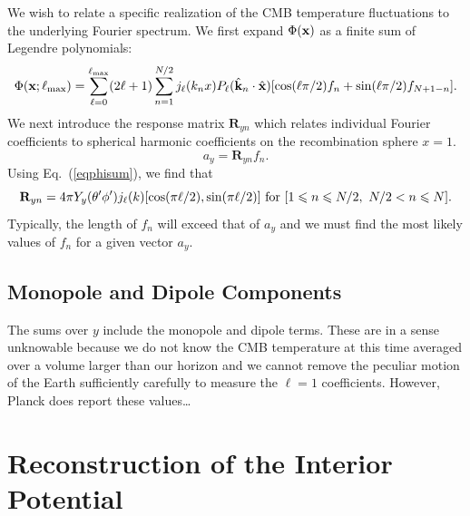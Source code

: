 \documentclass[useAMS,usenatbib,a4paper]{mn2e}
\begin{document}
We wish to relate a specific realization of the CMB temperature fluctuations to the underlying Fourier  spectrum. We first expand $\Phi({\bf x})$ as a finite sum of Legendre polynomials:
\begin{equation}
\Phi({\bf x;\ell_{\rm max}})=\sum_{\ell=0} ^{\ell_{\rm max}}(2\ell+1)\sum_{n=1}^{N/2}j_{\ell}(k_nx)P_{\ell}({\hat{\bf k}}_n\cdot{\hat{\bf x}})[\cos(\ell\pi/2)f_n+\sin(\ell\pi/2)f_{N+1-n}].
\label{eqphisum}
\end{equation}
We next introduce the response matrix ${\mathbf R}_{yn}$ which relates individual Fourier coefficients to spherical harmonic coefficients on the recombination sphere $x=1$.
\begin{equation}
a_y={\mathbf R}_{yn}f_n.
\end{equation}
Using Eq.~(\ref{eqphisum}), we find that 
\begin{equation}
\mathbf{R}_{yn}=4\pi Y_y(\theta'\phi')j_\ell(k)[\cos(\pi\ell/2),\sin(\pi\ell/2)]\ {\rm for}\ [1\le n\le N/2,\ N/2<n\le N].
\end{equation}
Typically, the length of $f_n$ will exceed that of $a_y$ and we must find the most likely values of $f_n$ for a given vector $a_y$.
\subsection{Monopole and Dipole Components}
The sums over $y$ include the monopole and dipole terms. These are in a sense unknowable because we do not know the CMB temperature at this time averaged over a volume larger than our horizon and we cannot remove the peculiar motion of the Earth sufficiently carefully to measure the $\ell=1$ coefficients. However, Planck does report these values\dots 
\section{Reconstruction of the Interior Potential}
\end{document}
